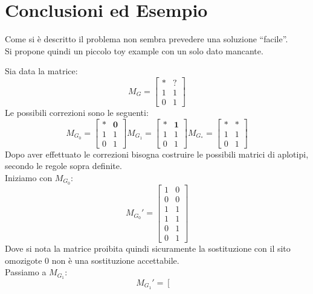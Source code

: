 \documentclass[a4paper,12pt, oneside]{book}
\begin{document}
\section{Conclusioni ed Esempio}
Come si è descritto il problema non sembra prevedere una soluzione ``facile''.\\
Si propone quindi un piccolo toy example con un solo dato mancante.
\begin{esempio}
  Sia data la matrice:
  \[
    M_G= \left[
      \begin{matrix}
        * & ? \\
        1 & 1 \\
        0 & 1 
      \end{matrix}
    \right]
  \]
  Le possibili correzioni sono le seguenti:
  \[
    M_{G_0}= \left[
      \begin{matrix}
        * & \mathbf{0} \\
        1 & 1 \\
        0 & 1 
      \end{matrix}
    \right]M_{G_1}= \left[
      \begin{matrix}
        * & \mathbf{1} \\
        1 & 1 \\
        0 & 1 
      \end{matrix}
    \right]M_{G_*}= \left[
      \begin{matrix}
        * & \bm{*} \\
        1 & 1 \\
        0 & 1 
      \end{matrix}
    \right]
  \]
  Dopo aver effettuato le correzioni bisogna costruire le possibili matrici di
  aplotipi, secondo le regole sopra definite.\\
  Iniziamo con $M_{G_0}$:
  \[M_{G_0}'
    = \left[
      \begin{matrix}
        1 & 0 \\
        0 & 0 \\
        1 & 1 \\
        1 & 1 \\
        0 & 1 \\
        0 & 1 
      \end{matrix}
    \right]
  \]
  Dove si nota la matrice proibita quindi sicuramente la sostituzione con il
  sito omozigote 0 non è una sostituzione accettabile.\\ 
  Passiamo a $M_{G_1}$:
  \[M_{G_1}'
    = \left[
      \begin{matrix}

\end{matrix}\]
\end{esempio}
\end{document}
